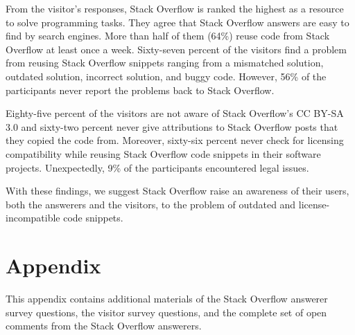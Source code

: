 \documentclass{svjour3}                     %
\begin{document}
From the visitor's responses, Stack Overflow is ranked the highest as a resource
to solve programming tasks. They agree that Stack Overflow answers are easy to
find by search engines. More than half of them (64\%) reuse code from Stack
Overflow at least once a week. Sixty-seven percent of the visitors find a
problem from reusing Stack Overflow snippets ranging from a mismatched solution,
outdated solution, incorrect solution, and buggy code. However, 56\% of the
participants never report the problems back to Stack Overflow.

Eighty-five percent of the visitors are not aware of Stack Overflow's CC BY-SA
3.0 and sixty-two percent never give attributions to Stack Overflow posts that they copied
the code from. Moreover, sixty-six percent never check for licensing compatibility while
reusing Stack Overflow code snippets in their software
projects. Unexpectedly, 9\%
of the participants encountered legal issues.

With these findings, we
suggest Stack Overflow raise an awareness of their users, both the answerers and
the visitors, to the problem of outdated and license-incompatible code snippets.


%
%

 

\clearpage
\section{Appendix}

This appendix contains additional materials of the Stack Overflow answerer
survey questions, the visitor survey questions, and the complete set of open
comments from the Stack Overflow answerers.

\clearpage

\appendix
\end{document}
